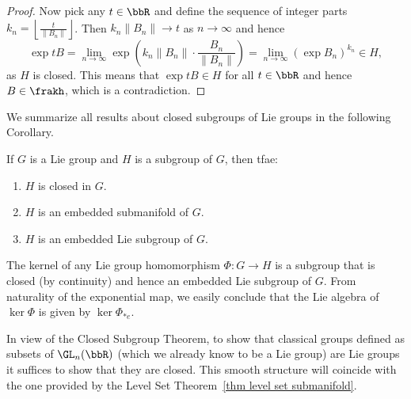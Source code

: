 \begin{proof}
    Now pick any $t\in \bbR$ and define the sequence of integer parts $k_n=\left\lfloor\frac{t}{\lVert B_n\rVert}\right\rfloor$. Then $k_n\lVert B_n\rVert\to t$ as $n\to\infty$ and hence
    \[\exp tB=\lim_{n\to \infty}\exp\left(k_n\lVert B_n\rVert\cdot \frac{B_n}{\lVert B_n\rVert}\right)=\lim_{n\to\infty}\left(\exp B_n\right)^{k_n}\in H,\]
    as $H$ is closed. This means that $\exp tB\in H$ for all $t\in\bbR$ and hence $B\in\frakh$, which is a contradiction.
\end{proof}

We summarize all results about closed subgroups of Lie groups in the following Corollary.

\begin{cor}
    If $G$ is a Lie group and $H$ is a subgroup of $G$, then \gls{tfae}:
    \begin{enumerate}
        \item $H$ is closed in $G$.
        \item $H$ is an embedded submanifold of $G$.
        \item $H$ is an embedded Lie subgroup of $G$.
    \end{enumerate}
\end{cor}

\begin{example}\label{example kernel Lie subgroup}
    The kernel of any Lie group homomorphism $\Phi:G\to H$ is a subgroup that is closed (by continuity) and hence an embedded Lie subgroup of $G$. From naturality of the exponential map, we easily conclude that the Lie algebra of $\ker \Phi$ is given by $\ker \Phi_{\ast e}$.
\end{example}

\begin{example}
    In view of the Closed Subgroup Theorem, to show that classical groups defined as subsets of $\GL_n(\bbR)$ (which we already know to be a Lie group) are Lie groups it suffices to show that they are closed. This smooth structure will coincide with the one provided by the Level Set Theorem~\ref{thm level set submanifold}.
\end{example}


